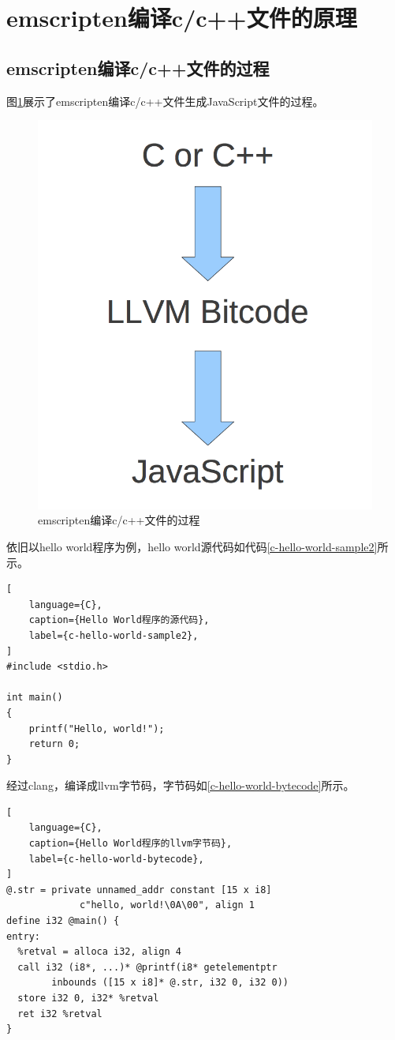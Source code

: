 \section{emscripten编译c/c++文件的原理}

\subsection{emscripten编译c/c++文件的过程}


图\ref{emscripten-compile-step}展示了emscripten编译c/c++文件生成JavaScript文件的过程。

\begin{figure}[h!] %
    \centering
    \includegraphics[width=100bp]{figure/pic/emscripten-compile-step.png}
    \caption{emscripten编译c/c++文件的过程}
    \label{emscripten-compile-step}
\end{figure}


依旧以hello world程序为例，hello world源代码如代码\ref{c-hello-world-sample2}所示。

\begin{lstlisting}[
    language={C},
    caption={Hello World程序的源代码},
    label={c-hello-world-sample2},
]
#include <stdio.h>

int main()
{
    printf("Hello, world!");
    return 0;
}
\end{lstlisting}

\newpage

经过clang，编译成llvm字节码，字节码如\ref{c-hello-world-bytecode}所示。

\begin{lstlisting}[
    language={C},
    caption={Hello World程序的llvm字节码},
    label={c-hello-world-bytecode},
]
@.str = private unnamed_addr constant [15 x i8]
             c"hello, world!\0A\00", align 1
define i32 @main() {
entry:
  %retval = alloca i32, align 4
  call i32 (i8*, ...)* @printf(i8* getelementptr
        inbounds ([15 x i8]* @.str, i32 0, i32 0))
  store i32 0, i32* %retval
  ret i32 %retval
}
\end{lstlisting}

